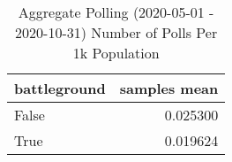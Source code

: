 \begin{table}
\centering
\caption{Aggregate Polling (2020-05-01 - 2020-10-31) Number of Polls Per 1k Population}
\label{table:aggregate\_polling\_2020-05-01\_-\_2020-10-31\_number\_of\_polls\_per\_1k\_population}
\begin{tabular}{lr}
\toprule
 battleground &  samples mean \\
\midrule
        False &      0.025300 \\
         True &      0.019624 \\
\bottomrule
\end{tabular}
\end{table}

